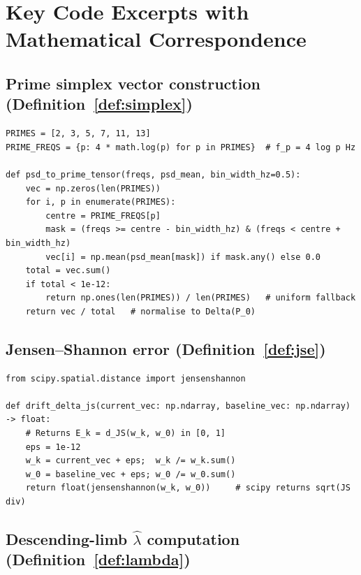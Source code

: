 \documentclass[12pt,a4paper]{article}
\theoremstyle{plain}
\theoremstyle{definition}
\begin{document}
\section{Key Code Excerpts with Mathematical Correspondence}
\label{sec:code}

\subsection{Prime simplex vector construction (Definition~\ref{def:simplex})}

\begin{lstlisting}[caption={PSD to prime tensor --- Gap 1 closure (\texttt{psd\_to\_tensor.py})}]
PRIMES = [2, 3, 5, 7, 11, 13]
PRIME_FREQS = {p: 4 * math.log(p) for p in PRIMES}  # f_p = 4 log p Hz

def psd_to_prime_tensor(freqs, psd_mean, bin_width_hz=0.5):
    vec = np.zeros(len(PRIMES))
    for i, p in enumerate(PRIMES):
        centre = PRIME_FREQS[p]
        mask = (freqs >= centre - bin_width_hz) & (freqs < centre + bin_width_hz)
        vec[i] = np.mean(psd_mean[mask]) if mask.any() else 0.0
    total = vec.sum()
    if total < 1e-12:
        return np.ones(len(PRIMES)) / len(PRIMES)   # uniform fallback
    return vec / total   # normalise to Delta(P_0)
\end{lstlisting}

\subsection{Jensen--Shannon error (Definition~\ref{def:jse})}

\begin{lstlisting}[caption={JS error metric --- Gap 2 closure (\texttt{constitutional\_field.py} patch)}]
from scipy.spatial.distance import jensenshannon

def drift_delta_js(current_vec: np.ndarray, baseline_vec: np.ndarray) -> float:
    # Returns E_k = d_JS(w_k, w_0) in [0, 1]
    eps = 1e-12
    w_k = current_vec + eps;  w_k /= w_k.sum()
    w_0 = baseline_vec + eps; w_0 /= w_0.sum()
    return float(jensenshannon(w_k, w_0))     # scipy returns sqrt(JS div)
\end{lstlisting}

\subsection{Descending-limb $\hat\lambda$ computation (Definition~\ref{def:lambda})}
\end{document}
